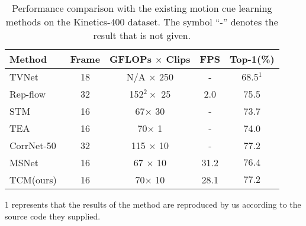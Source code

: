 \documentclass[journal]{IEEEtran}
\begin{document}
\begin{table}[!ht]
\centering
\caption{Performance comparison with the existing motion cue learning methods on the Kinetics-400 dataset. The symbol ``-” denotes the result that is not given.}
\label{tab:motion-k400}
\begin{threeparttable}
\begin{tabular}{lcccc}
\hline
Method                   & Frame & GFLOPs $\times$ Clips & FPS & Top-1(\%) \\ \hline
TVNet~\cite{fan2018end} & 18    & N/A $\times$ 250     & -    & 68.5$^1$ \\
Rep-flow~\cite{piergiovanni2019representation} & 32    & 152$^{2} \times$ 25     & 2.0    & 75.5 \\
STM~\cite{jiang2019stm} & 16    & 67$\times$ 30      & -    & 73.7 \\
TEA~\cite{li2020tea}    & 16    & 70$\times$ 1       & -    & 74.0 \\
CorrNet-50~\cite{wang2020video} & 32  & 115 $\times$ 10      & -    & 77.2 \\
MSNet~\cite{kwon2020motionsqueeze}  & 16    & 67 $\times$ 10     & 31.2  & $76.4$ \\
TCM(ours)                     & 16    & 70$\times$ 10     & 28.1  & $\mathbf{77.2}$ \\
\hline
\end{tabular}
\begin{tablenotes}
  \footnotesize
  \item[1] represents that the results of the method are reproduced by us according to the source code they supplied.
\end{tablenotes}
\end{threeparttable}
\end{table}
\end{document}
